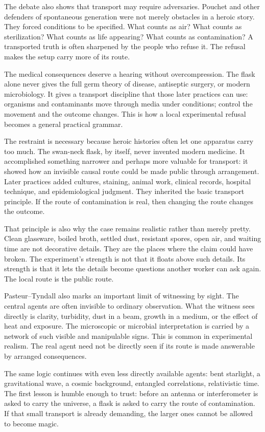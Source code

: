 The debate also shows that transport may require adversaries. Pouchet and
other defenders of spontaneous generation were not merely obstacles in a
heroic story. They forced conditions to be specified. What counts as air?
What counts as sterilization? What counts as life appearing? What counts
as contamination? A transported truth is often sharpened by the people who
refuse it. The refusal makes the setup carry more of its route.

The medical consequences deserve a hearing without overcompression. The
flask alone never gives the full germ theory of disease, antiseptic
surgery, or modern microbiology. It gives a transport discipline that
those later practices can use: organisms and contaminants move through
media under conditions; control the movement and the outcome changes.
This is how a local experimental refusal becomes a general practical
grammar.

The restraint is necessary because heroic histories often let one
apparatus carry too much. The swan-neck flask, by itself, never invented
modern medicine. It accomplished something narrower and perhaps more
valuable for transport: it showed how an invisible causal route could be
made public through arrangement. Later practices added cultures, staining,
animal work, clinical records, hospital technique, and epidemiological
judgment. They inherited the basic transport principle. If the route of
contamination is real, then changing the route changes the outcome.

That principle is also why the case remains realistic rather than merely
pretty. Clean glassware, boiled broth, settled dust, resistant spores,
open air, and waiting time are not decorative details. They are the places
where the claim could have broken. The experiment's strength is not that
it floats above such details. Its strength is that it lets the details
become questions another worker can ask again. The local route is the
public route.

Pasteur--Tyndall also marks an important limit of witnessing by sight.
The central agents are often invisible to ordinary observation. What the
witness sees directly is clarity, turbidity, dust in a beam, growth in a
medium, or the effect of heat and exposure. The microscopic or microbial
interpretation is carried by a network of such visible and manipulable
signs. This is common in experimental realism. The real agent need not be
directly seen if its route is made answerable by arranged consequences.

The same logic continues with even less directly available agents: bent
starlight, a gravitational wave, a cosmic background, entangled
correlations, relativistic time. The first lesson is humble enough to
trust: before an antenna or interferometer is asked to carry the universe,
a flask is asked to carry the route of contamination. If that small
transport is already demanding, the larger ones cannot be allowed to
become magic.

